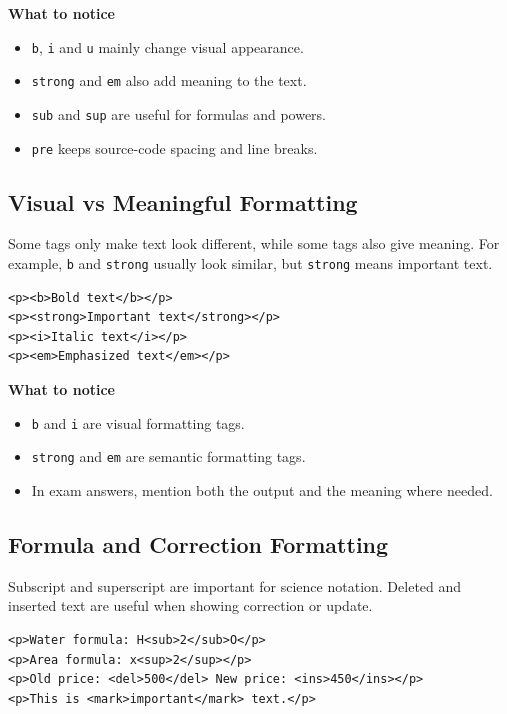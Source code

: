 \textbf{What to notice}
\begin{itemize}
    \item \texttt{b}, \texttt{i} and \texttt{u} mainly change visual appearance.
    \item \texttt{strong} and \texttt{em} also add meaning to the text.
    \item \texttt{sub} and \texttt{sup} are useful for formulas and powers.
    \item \texttt{pre} keeps source-code spacing and line breaks.
\end{itemize}

\subsection{Visual vs Meaningful Formatting}
Some tags only make text look different, while some tags also give meaning. For example, \texttt{b} and \texttt{strong} usually look similar, but \texttt{strong} means important text.

\begin{lstlisting}[style=htmlide, caption={Visual and Meaningful Formatting}]
<p><b>Bold text</b></p>
<p><strong>Important text</strong></p>
<p><i>Italic text</i></p>
<p><em>Emphasized text</em></p>
\end{lstlisting}

\textbf{What to notice}
\begin{itemize}
    \item \texttt{b} and \texttt{i} are visual formatting tags.
    \item \texttt{strong} and \texttt{em} are semantic formatting tags.
    \item In exam answers, mention both the output and the meaning where needed.
\end{itemize}

\subsection{Formula and Correction Formatting}
Subscript and superscript are important for science notation. Deleted and inserted text are useful when showing correction or update.

\begin{lstlisting}[style=htmlide, caption={Formula and Correction Tags}]
<p>Water formula: H<sub>2</sub>O</p>
<p>Area formula: x<sup>2</sup></p>
<p>Old price: <del>500</del> New price: <ins>450</ins></p>
<p>This is <mark>important</mark> text.</p>
\end{lstlisting}


